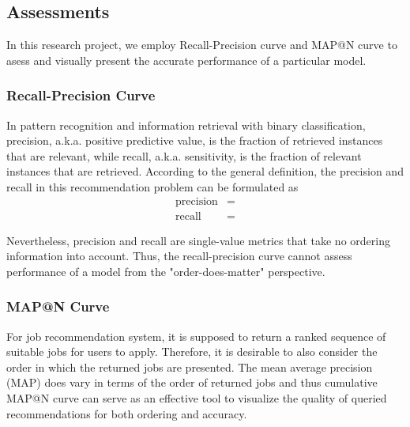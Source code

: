 \documentclass{article} %
\begin{document}
% 
\subsection{Assessments}
In this research project, we employ Recall-Precision curve and MAP@N curve to 
asess and visually present the accurate performance of a particular model. 
\subsubsection{Recall-Precision Curve}
In pattern recognition and information retrieval with binary classification,
precision, a.k.a. positive predictive value, is the fraction of retrieved
instances that are relevant, while recall, a.k.a. sensitivity, is the
fraction of relevant instances that are retrieved. According to the general
definition, the precision and recall in this recommendation problem can be
formulated as 
\begin{align}
    \text{precision} &=  \\
    \text{recall} &= 
\end{align}

Nevertheless, precision and recall are single-value metrics that take no ordering information
into account. Thus, the recall-precision curve cannot assess performance of a
model from the "order-does-matter" perspective.
\subsubsection{MAP@N Curve}
For job recommendation system, it is supposed to return a ranked sequence of
suitable jobs for users to apply. Therefore, it is desirable to also consider the
order in which the returned jobs are presented. The mean average precision
(MAP) does vary in terms of the order of returned jobs and thus cumulative
MAP@N curve can serve as an effective tool to visualize the quality of queried
recommendations for both ordering and accuracy.
\end{document}
